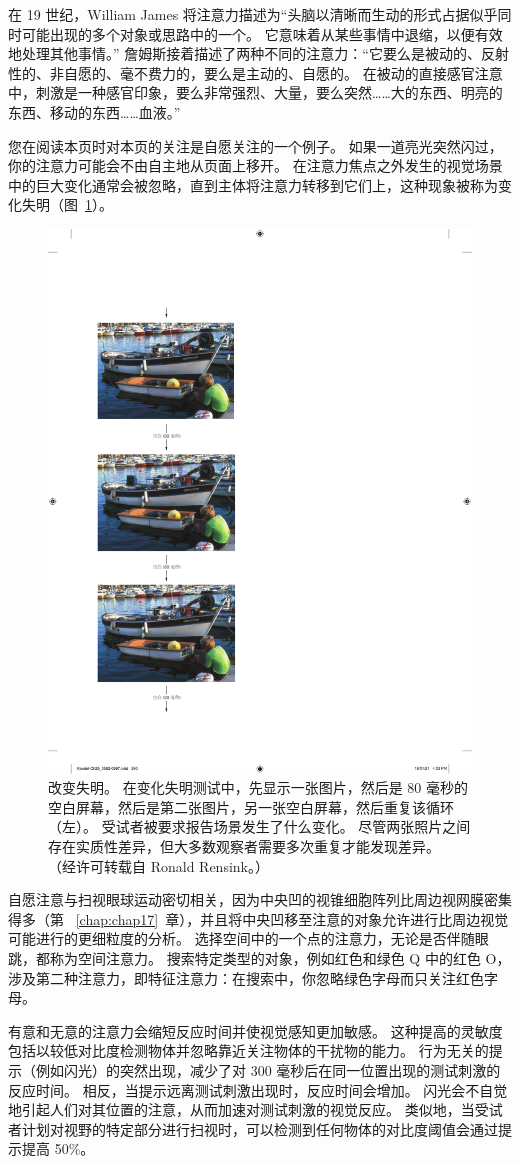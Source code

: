 在 19 世纪，William James 将注意力描述为“头脑以清晰而生动的形式占据似乎同时可能出现的多个对象或思路中的一个。
它意味着从某些事情中退缩，以便有效地处理其他事情。” 
詹姆斯接着描述了两种不同的注意力：“它要么是被动的、反射性的、非自愿的、毫不费力的，要么是主动的、自愿的。
在被动的直接感官注意中，刺激是一种感官印象，要么非常强烈、大量，要么突然……大的东西、明亮的东西、移动的东西……血液。”


您在阅读本页时对本页的关注是自愿关注的一个例子。 如果一道亮光突然闪过，你的注意力可能会不由自主地从页面上移开。
在注意力焦点之外发生的视觉场景中的巨大变化通常会被忽略，直到主体将注意力转移到它们上，这种现象被称为变化失明（图~\ref{fig:25_8}）。


\begin{figure}[htbp]
	\centering
	\includegraphics[width=0.5\linewidth]{chap25/fig_25_8}
	\caption{改变失明。 在变化失明测试中，先显示一张图片，然后是 80 毫秒的空白屏幕，然后是第二张图片，另一张空白屏幕，然后重复该循环（左）。 受试者被要求报告场景发生了什么变化。 尽管两张照片之间存在实质性差异，但大多数观察者需要多次重复才能发现差异。 （经许可转载自 Ronald Rensink。）}
	\label{fig:25_8}
\end{figure}


自愿注意与扫视眼球运动密切相关，因为中央凹的视锥细胞阵列比周边视网膜密集得多（第 ~\ref{chap:chap17}~章），并且将中央凹移至注意的对象允许进行比周边视觉可能进行的更细粒度的分析。 选择空间中的一个点的注意力，无论是否伴随眼跳，都称为空间注意力。
搜索特定类型的对象，例如红色和绿色 Q 中的红色 O，涉及第二种注意力，即特征注意力：在搜索中，你忽略绿色字母而只关注红色字母。


有意和无意的注意力会缩短反应时间并使视觉感知更加敏感。
这种提高的灵敏度包括以较低对比度检测物体并忽略靠近关注物体的干扰物的能力。
行为无关的提示（例如闪光）的突然出现，减少了对 300 毫秒后在同一位置出现的测试刺激的反应时间。
相反，当提示远离测试刺激出现时，反应时间会增加。
闪光会不自觉地引起人们对其位置的注意，从而加速对测试刺激的视觉反应。
类似地，当受试者计划对视野的特定部分进行扫视时，可以检测到任何物体的对比度阈值会通过提示提高 50\%。



